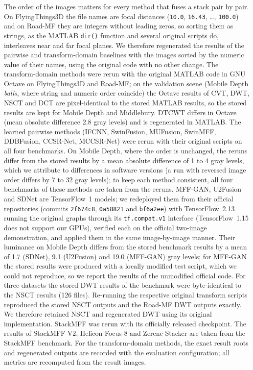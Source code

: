 The order of the images matters for every method that fuses a stack pair by pair. On FlyingThings3D the file names are focal distances (\texttt{10.0}, \texttt{16.43}, \dots, \texttt{100.0}) and on Road-MF they are integers without leading zeros, so sorting them as strings, as the MATLAB \texttt{dir()} function and several original scripts do, interleaves near and far focal planes. We therefore regenerated the results of the pairwise and transform-domain baselines with the images sorted by the numeric value of their names, using the original code with no other change. The transform-domain methods were rerun with the original MATLAB code in GNU Octave on FlyingThings3D and Road-MF; on the validation scene (Mobile Depth \emph{balls}, where string and numeric order coincide) the Octave results of CVT, DWT, NSCT and DCT are pixel-identical to the stored MATLAB results, so the stored results are kept for Mobile Depth and Middlebury. DTCWT differs in Octave (mean absolute difference 2.8 gray levels) and is regenerated in MATLAB. The learned pairwise methods (IFCNN, SwinFusion, MUFusion, SwinMFF, DDBFusion, CCSR-Net, MCCSR-Net) were rerun with their original scripts on all four benchmarks. On Mobile Depth, where the order is unchanged, the reruns differ from the stored results by a mean absolute difference of 1 to 4 gray levels, which we attribute to differences in software versions (a run with reversed image order differs by 7 to 32 gray levels); to keep each method consistent, all four benchmarks of these methods are taken from the reruns. MFF-GAN, U2Fusion and SDNet are TensorFlow~1 models; we redeployed them from their official repositories (commits \texttt{2f674c8}, \texttt{0a58821} and \texttt{bf6a2ee}) with TensorFlow~2.13 running the original graphs through its \texttt{tf.compat.v1} interface (TensorFlow~1.15 does not support our GPUs), verified each on the official two-image demonstration, and applied them in the same image-by-image manner. Their luminance on Mobile Depth differs from the stored benchmark results by a mean of 1.7 (SDNet), 9.1 (U2Fusion) and 19.0 (MFF-GAN) gray levels; for MFF-GAN the stored results were produced with a locally modified test script, which we could not reproduce, so we report the results of the unmodified official code. For three datasets the stored DWT results of the benchmark were byte-identical to the NSCT results (126 files). Re-running the respective original transform scripts reproduced the stored NSCT outputs and the Road-MF DWT outputs exactly. We therefore retained NSCT and regenerated DWT using its original implementation. StackMFF was rerun with its officially released checkpoint. The results of StackMFF V2, Helicon Focus 8 and Zerene Stacker are taken from the StackMFF benchmark. For the transform-domain methods, the exact result roots and regenerated outputs are recorded with the evaluation configuration; all metrics are recomputed from the result images. 

